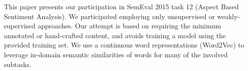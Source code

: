 This paper presents our participation in SemEval 2015 task 12 (Aspect Based Sentiment Analysis). We participated employing only unsupervised or weakly-supervised approaches. Our attempt is based on requiring the minimum annotated or hand-crafted content, and avoids training a model using the provided training set. We use a continuous word representations (Word2Vec) to leverage in-domain semantic similarities of words for many of the involved subtasks.
